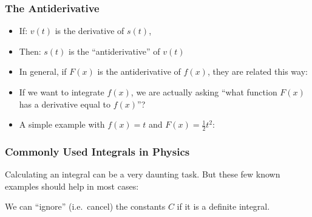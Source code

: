 \documentclass[12pt,compress,aspectratio=169]{beamer}
\begin{document}
\begin{frame}
  \frametitle{The Antiderivative}
  \begin{itemize}
  \item If: $v(t)$ is the derivative of $s(t)$,
  \item Then: $s(t)$ is the ``antiderivative'' of $v(t)$
  \item In general, if $F(x)$ is the antiderivative of $f(x)$, they are related
    this way:
    

  \item If we want to integrate $f(x)$, we are actually asking
    ``what function $F(x)$ has a derivative equal to $f(x)$''?
  \item A simple example with $f(x)=t$ and $F(x)=\frac{1}{2}t^2$:

  \end{itemize}
\end{frame}

\begin{frame}
  \frametitle{Commonly Used Integrals in Physics}
  Calculating an integral can be a very daunting task. But these few known
  examples should help in most cases:

  We can ``ignore'' (i.e.\ cancel) the constants $C$ if it is a definite
  integral.
\end{frame}
\end{document}
